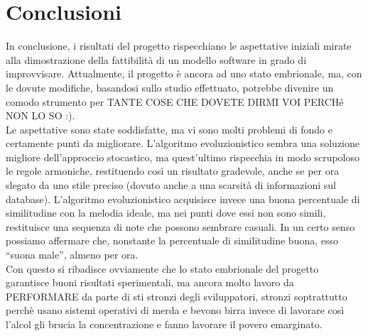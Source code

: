 \section{Conclusioni}
In conclusione, i risultati del progetto rispecchiano le aspettative iniziali
mirate alla dimostrazione della fattibilità di un modello software in grado di improvvisare.
Attualmente, il progetto è ancora ad uno stato embrionale, ma, con le dovute
modifiche, basandosi sullo studio effettuato, potrebbe divenire un comodo
strumento per TANTE COSE CHE DOVETE DIRMI VOI PERCHé NON LO SO :).\\
Le aspettative sono state soddisfatte, ma vi sono molti problemi di fondo e certamente punti da migliorare.
L'algoritmo evoluzionistico sembra una soluzione migliore dell'approccio stocastico, ma quest'ultimo rispecchia in modo scrupoloso le regole armoniche, restituendo così un risultato gradevole, anche se per ora slegato da uno stile preciso (dovuto anche a una scarsità di informazioni sul database).
L'algoritmo evoluzionistico acquisisce invece una buona percentuale di similitudine con la melodia ideale, ma nei punti dove essi non sono simili, restituisce una sequenza di note che possono sembrare casuali.
In un certo senso possiamo affermare che, nonstante la percentuale di similitudine buona, esso ``suona male'', almeno per ora.\\
Con questo si ribadisce ovviamente che lo stato embrionale del progetto garantisce buoni risultati sperimentali, ma ancora molto lavoro da PERFORMARE da parte di sti stronzi degli sviluppatori, stronzi soptrattutto perchè usano sistemi operativi di merda e bevono birra invece di lavorare così l'alcol gli brucia la concentrazione e fanno lavorare il povero emarginato.


